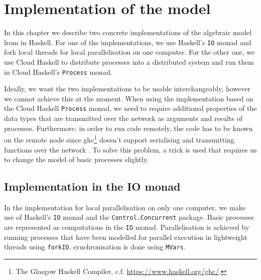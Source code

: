 \chapter{Implementation of the model}
In this chapter we describe two concrete implementations of the algebraic model from  in \textsf{Haskell}. For one of the implementations, we use \textsf{Haskell}'s \texttt{IO} monad and fork local threads for local parallelisation on one computer. For the other one, we use \textsf{Cloud Haskell} to distribute processes into a distributed system and run them in \textsf{Cloud Haskell}'s \texttt{Process} monad.

Ideally, we want the two implementations to be usable interchangeably, however we cannot achieve this at the moment. When using the implementation based on the \textsf{Cloud Haskell} \texttt{Process} monad, we need to require additional properties of the data types that are transmitted over the network as arguments and results of processes. Furthermore, in order to run code remotely, the code has to be known on the remote node since ghc\footnote{The Glasgow Haskell Compiler, c.f. \url{https://www.haskell.org/ghc/}.} doesn't support serialising and transmitting functions over the network \cite{Epstein:2011:THC:2034675.2034690}. To solve this problem, a trick is used that requires us to change the model of basic processes slightly.


\section{Implementation in the IO monad}
\label{chp:local}
In the implementation for local parallelisation on only one computer, we make use of \textsf{Haskell}'s \texttt{IO} monad and the \texttt{Control.Concurrent} package. Basic processes are represented as computations in the \texttt{IO} monad. Parallelisation is achieved by running processes that have been modelled for parallel execution in lightweight threads using \texttt{forkIO}, synchronisation is done using \texttt{MVars}.

